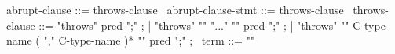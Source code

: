\begin{syntax}
  abrupt-clause ::= throws-clause
  \
  abrupt-clause-stmt ::= throws-clause
  \
  throws-clause ::= "throws" pred ";" ;
                  | "throws" "{" "..." "}" pred ";" ;
                  | "throws" "{" C-type-name ( "," C-type-name )* "}" pred ";" ;
  \
  term  ::= "\exception"
\end{syntax}
